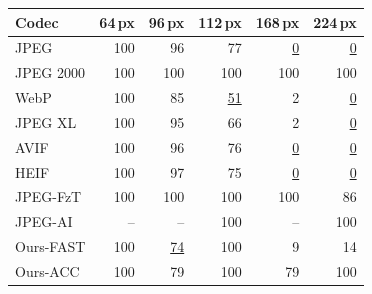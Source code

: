 \begin{tabular}{lrrrrr}
\toprule
Codec & 64\,px & 96\,px & 112\,px & 168\,px & 224\,px \\
\midrule
JPEG & 100 & 96 & 77 & \cellcolor{red!22}\underline{0} & \cellcolor{red!22}\underline{0} \\
JPEG 2000 & 100 & 100 & 100 & 100 & 100 \\
WebP & 100 & 85 & \cellcolor{red!22}\underline{51} & 2 & \cellcolor{red!22}\underline{0} \\
JPEG XL & 100 & 95 & 66 & 2 & \cellcolor{red!22}\underline{0} \\
AVIF & 100 & 96 & 76 & \cellcolor{red!22}\underline{0} & \cellcolor{red!22}\underline{0} \\
HEIF & 100 & 97 & 75 & \cellcolor{red!22}\underline{0} & \cellcolor{red!22}\underline{0} \\
JPEG-FzT & 100 & 100 & 100 & 100 & 86 \\
JPEG-AI & -- & -- & 100 & -- & 100 \\
Ours-FAST & 100 & \cellcolor{red!22}\underline{74} & 100 & 9 & 14 \\
Ours-ACC & 100 & 79 & 100 & 79 & 100 \\
\bottomrule
\end{tabular}
